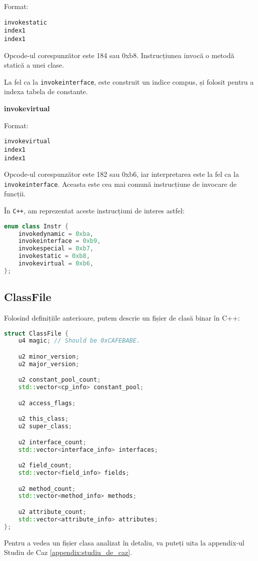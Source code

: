 Format:
\begin{verbatim}
invokestatic
index1
index1
\end{verbatim}

Opcode-ul corespunzător este 184 sau 0xb8.
Instrucțiunea invocă o metodă statică a unei clase.

La fel ca la \texttt{invokeinterface}, este construit un indice compus,
și folosit pentru a indexa tabela de constante.

\textbf{invokevirtual}

Format:
\begin{verbatim}
invokevirtual
index1
index1
\end{verbatim}

Opcode-ul corespunzător este 182 sau 0xb6, iar
interpretarea este la fel ca la \texttt{invokeinterface}.
Aceasta este cea mai comună
instrucțiune de invocare de funcții.

În \texttt{C++}, am reprezentat aceste instrucțiuni de interes astfel:

\begin{lstlisting}[language=C++]
enum class Instr {
    invokedynamic = 0xba,
    invokeinterface = 0xb9,
    invokespecial = 0xb7,
    invokestatic = 0xb8,
    invokevirtual = 0xb6,
};
\end{lstlisting}

\subsection{ClassFile}\label{classfile}

Folosind definițiile anterioare, putem descrie un fișier de clasă binar
în C++:

\begin{lstlisting}[language=C++]
struct ClassFile {
    u4 magic; // Should be 0xCAFEBABE.

    u2 minor_version;
    u2 major_version;

    u2 constant_pool_count;
    std::vector<cp_info> constant_pool;

    u2 access_flags;

    u2 this_class;
    u2 super_class;

    u2 interface_count;
    std::vector<interface_info> interfaces;

    u2 field_count;
    std::vector<field_info> fields;

    u2 method_count;
    std::vector<method_info> methods;

    u2 attribute_count;
    std::vector<attribute_info> attributes;
};
\end{lstlisting}

Pentru a vedea un fișier clasa analizat în detaliu, va puteți
uita la appendix-ul Studiu de Caz \ref{appendix:studiu_de_caz}.
